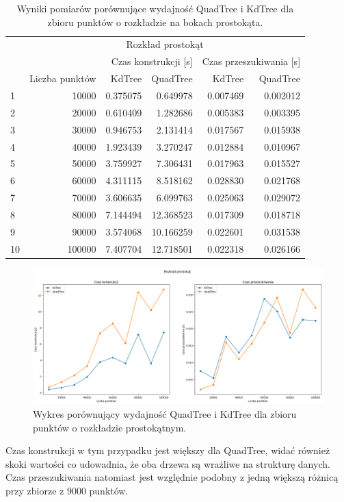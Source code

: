 \documentclass{lab}
\begin{document}
\begin{table}[H]
\centering
\begin{tabular}{lrrrrr}
  \toprule
   & \multicolumn{5}{c}{Rozkład prostokąt} \\
   &  & \multicolumn{2}{r}{Czas konstrukcji [s]} & \multicolumn{2}{r}{Czas przeszukiwania [s]} \\
   & Liczba punktów & KdTree & QuadTree & KdTree & QuadTree \\
  \midrule
 1 & 10000 & 0.375075 & 0.649978 & 0.007469 & 0.002012 \\
2 & 20000 & 0.610409 & 1.282686 & 0.005383 & 0.003395 \\
3 & 30000 & 0.946753 & 2.131414 & 0.017567 & 0.015938 \\
4 & 40000 & 1.923439 & 3.270247 & 0.012884 & 0.010967 \\
5 & 50000 & 3.759927 & 7.306431 & 0.017963 & 0.015527 \\
6 & 60000 & 4.311115 & 8.518162 & 0.028830 & 0.021768 \\
7 & 70000 & 3.606635 & 6.099763 & 0.025063 & 0.029072 \\
8 & 80000 & 7.144494 & 12.368523 & 0.017309 & 0.018718 \\
9 & 90000 & 3.574068 & 10.166259 & 0.022601 & 0.031538 \\
10 & 100000 & 7.407704 & 12.718501 & 0.022318 & 0.026166 \\
  \bottomrule
  \end{tabular}
\caption{Wyniki pomiarów porównujące wydajność QuadTree i KdTree dla zbioru punktów o rozkładzie na bokach prostokąta.}
\label{tab:rectangle_time}
\end{table}

\begin{figure}[H]
  \centering
  \includegraphics[width=1\textwidth]{resources/rectangle_graph.png}
  \caption{Wykres porównujący wydajność QuadTree i KdTree dla zbioru punktów o rozkładzie prostokątnym.}
  \label{fig:rectangle_graph}
\end{figure}
Czas konstrukcji w tym przypadku jest większy dla QuadTree, widać również skoki wartości co udowadnia, że oba drzewa są wrażliwe na strukturę danych. Czas przeszukiwania natomiast jest względnie podobny z jedną większą różnicą przy zbiorze z 9000 punktów.
\end{document}
